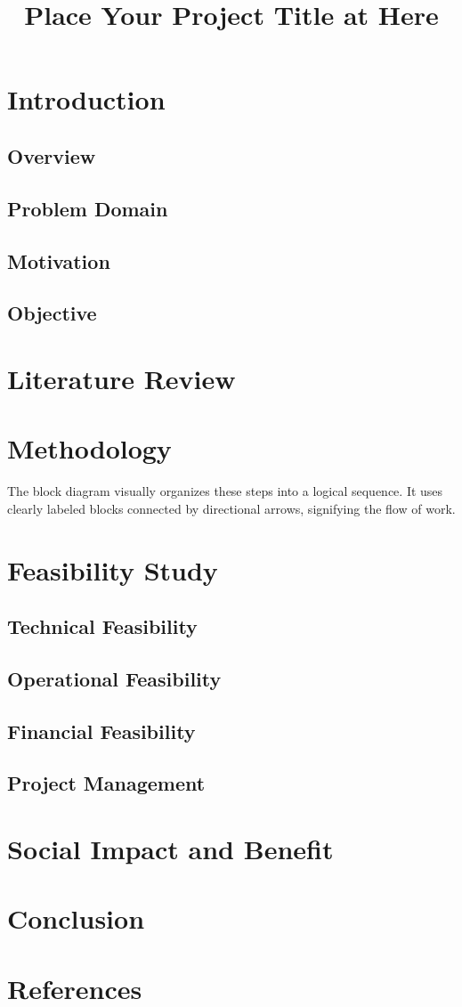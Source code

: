 \documentclass[12pt]{report}
\title{Place Your Project Title at Here}
\begin{document}
    
    \tableofcontents
  


\newpage
\chapter{Introduction}

\section{Overview}

\section{Problem Domain}
\section{Motivation}
\section{Objective}


\chapter{Literature Review}

\chapter{Methodology}
The block diagram visually organizes these steps into a logical sequence. It uses clearly labeled blocks connected by directional arrows, signifying the flow of work.
\chapter{Feasibility Study}

\section{Technical Feasibility}
\section{Operational Feasibility}
\section{Financial Feasibility}
\section{Project Management}

\chapter{Social Impact and Benefit}
\chapter{Conclusion}

\newpage
\renewcommand\bibname{References}
\chapter{References}


\end{document}
